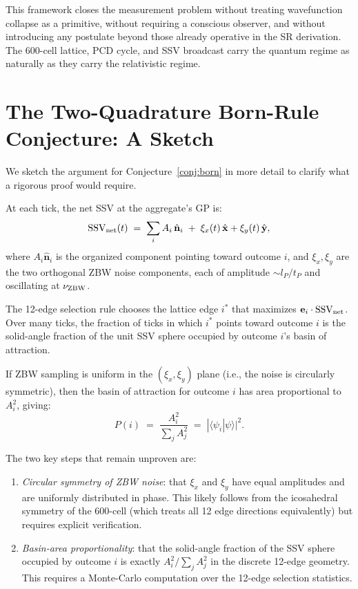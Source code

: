 \documentclass[12pt]{article}
\newcommand{\lP}{l_P}
\newcommand{\tP}{t_P}
\newcommand{\SSV}{\text{SSV}}
\begin{document}
This framework closes the measurement problem without treating wavefunction
collapse as a primitive, without requiring a conscious observer, and without
introducing any postulate beyond those already operative in the SR derivation.
The 600-cell lattice, PCD cycle, and SSV broadcast carry the quantum regime
as naturally as they carry the relativistic regime.

\appendix
\section{The Two-Quadrature Born-Rule Conjecture: A Sketch}
\label{app:born}

We sketch the argument for Conjecture~\ref{conj:born} in more detail to
clarify what a rigorous proof would require.

At each tick, the net SSV at the aggregate's GP is:
\begin{equation}
  \SSV_{\rm net}(t) \;=\; \sum_i A_i\,\hat{\mathbf{n}}_i
  \;+\; \xi_x(t)\,\hat{\mathbf{x}} + \xi_y(t)\,\hat{\mathbf{y}},
  \label{eq:netSSV}
\end{equation}
where $A_i\hat{\mathbf{n}}_i$ is the organized component pointing toward
outcome $i$, and $\xi_x, \xi_y$ are the two orthogonal ZBW noise components,
each of amplitude $\sim \lP/\tP$ and oscillating at $\nu_{\rm ZBW}$.

The 12-edge selection rule chooses the lattice edge $i^*$ that maximizes
$\mathbf{e}_i\cdot\SSV_{\rm net}$.  Over many ticks, the fraction of ticks
in which $i^*$ points toward outcome $i$ is the solid-angle fraction of the
unit SSV sphere occupied by outcome $i$'s basin of attraction.

If ZBW sampling is uniform in the $(\xi_x, \xi_y)$ plane (i.e., the noise
is circularly symmetric), then the basin of attraction for outcome $i$ has
area proportional to $A_i^2$, giving:
\begin{equation}
  P(i) \;=\; \frac{A_i^2}{\sum_j A_j^2}
  \;=\; |\langle\psi_i|\psi\rangle|^2.
  \label{eq:born_sketch}
\end{equation}

The two key steps that remain unproven are:
\begin{enumerate}[noitemsep]
  \item \emph{Circular symmetry of ZBW noise}: that $\xi_x$ and $\xi_y$
    have equal amplitudes and are uniformly distributed in phase.  This
    likely follows from the icosahedral symmetry of the 600-cell (which
    treats all 12 edge directions equivalently) but requires explicit
    verification.
  \item \emph{Basin-area proportionality}: that the solid-angle fraction of
    the SSV sphere occupied by outcome $i$ is exactly $A_i^2/\sum_j A_j^2$
    in the discrete 12-edge geometry.  This requires a Monte-Carlo
    computation over the 12-edge selection statistics.
\end{enumerate}
\end{document}
